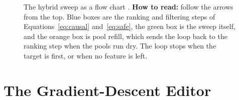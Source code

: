 \begin{figure}[!htb]
\centering
{}
\caption[The hybrid sweep as a flow chart]{The hybrid sweep as a flow chart \cite{p6}. \textbf{How to read:} follow the arrows from the top. Blue boxes are the ranking and filtering steps of Equations~\ref{eq:causal} and~\ref{eq:safe}, the green box is the sweep itself, and the orange box is pool refill, which sends the loop back to the ranking step when the pools run dry. The loop stops when the target is first, or when no feature is left.}\label{fig:algo}
\end{figure}

\section{The Gradient-Descent Editor}\label{sec:gd-method}

